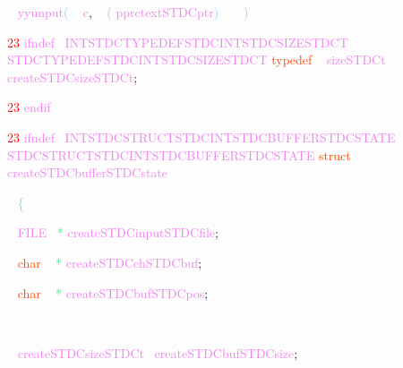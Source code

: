 \documentclass[8, usernames, dvipsnames]{beamer}
\begin{document}
\begin{frame}
\textcolor{White}{\ }
\textcolor{Violet}{yyunput}\textcolor{SkyBlue}{(}
\textcolor{White}{\ }
\textcolor{Violet}{c}\textcolor{Sepia}{,}
\textcolor{White}{\ }
\textcolor{SkyBlue}{(}
\textcolor{Violet}{pprctextSTDCptr}\textcolor{SkyBlue}{)}
\textcolor{White}{\ }
\textcolor{White}{\ }
\textcolor{SkyBlue}{)}

 
  \textcolor{Red}{23}
\textcolor{Violet}{ifndef}\textcolor{White}{\ }
\textcolor{Violet}{INTSTDCTYPEDEFSTDCINTSTDCSIZESTDCT}
 \textcolor{Violet}{STDCTYPEDEFSTDCINTSTDCSIZESTDCT}
 \textcolor{OrangeRed}{typedef}
\textcolor{White}{\ }
\textcolor{Violet}{sizeSTDCt}\textcolor{White}{\ }
\textcolor{Violet}{createSTDCsizeSTDCt}\textcolor{Sepia}{;}

  \textcolor{Red}{23}
\textcolor{Violet}{endif}
 
  \textcolor{Red}{23}
\textcolor{Violet}{ifndef}\textcolor{White}{\ }
\textcolor{Violet}{INTSTDCSTRUCTSTDCINTSTDCBUFFERSTDCSTATE}
 \textcolor{Violet}{STDCSTRUCTSTDCINTSTDCBUFFERSTDCSTATE}
 \textcolor{OrangeRed}{struct}
\textcolor{White}{\ }
\textcolor{Violet}{createSTDCbufferSTDCstate}
 \end{frame}
\begin{frame}
\textcolor{White}{\   }
\textcolor{SkyBlue}{\{ }

 \textcolor{White}{\   }
\textcolor{Violet}{FILE}\textcolor{White}{\ }
\textcolor{SpringGreen}{*}
\textcolor{Violet}{createSTDCinputSTDCfile}\textcolor{Sepia}{;}

 
 \textcolor{White}{\   }
\textcolor{OrangeRed}{char}
\textcolor{White}{\ }
\textcolor{SpringGreen}{*}
\textcolor{Violet}{createSTDCchSTDCbuf}\textcolor{Sepia}{;}
\textcolor{White}{\   }
\textcolor{White}{\   }

 \textcolor{White}{\   }
\textcolor{OrangeRed}{char}
\textcolor{White}{\ }
\textcolor{SpringGreen}{*}
\textcolor{Violet}{createSTDCbufSTDCpos}\textcolor{Sepia}{;}
\textcolor{White}{\   }
\textcolor{White}{\   }

 
 \textcolor{White}{\   }

 \textcolor{White}{\   }
\textcolor{Violet}{createSTDCsizeSTDCt}\textcolor{White}{\ }
\textcolor{Violet}{createSTDCbufSTDCsize}\textcolor{Sepia}{;}

 
 \textcolor{White}{\   }

 \end{frame}
\end{document}
